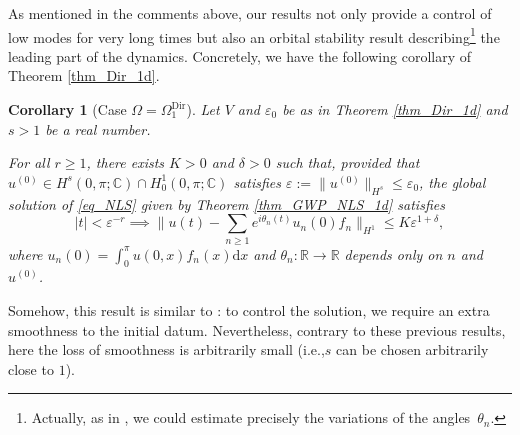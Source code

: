 \documentclass[11pt]{article}
\newcommand{\ie}{i.e.,\xspace}
\let\epsilon\varepsilon
\newtheorem{corollary}[theorem]{Corollary}
\theoremstyle{definition}
\begin{document}
As mentioned in the comments above, our results not only provide a control of low modes for very long times but also an orbital stability result describing\footnote{Actually, as in \cite[Th.\,1]{KtA}, we could estimate precisely the variations of the angles~$\theta_n$.} the leading part of the dynamics. Concretely, we have the following corollary of Theorem \ref{thm_Dir_1d}.
\begin{corollary}[Case $\Omega = \Omega^{\mathrm{Dir}}_1$] \label{cor_whaou}
Let $V$ and $\epsilon_0$ be as in Theorem \ref{thm_Dir_1d} and $s> 1$ be a real number.

For all $r\geq 1$, there exists $K>0$ and $\delta >0$ such that, provided that $u^{(0)}\in H^s(0,\pi;\mathbb{C}) \cap H^1_0(0,\pi;\mathbb{C})$ satisfies $\varepsilon:= \| u^{(0)} \|_{H^s} \leq \epsilon_0$, the global solution of \eqref{eq_NLS} given by Theorem \ref{thm_GWP_NLS_1d} satisfies
\[
|t|< \varepsilon^{-r} \implies \biggl\| u(t) - \sum_{n\geq 1} e^{i\theta_n(t)} u_n(0) f_n \biggr\|_{H^1} \leq K \varepsilon^{1+\delta},
\]
where $u_n(0) = \int_0^\pi u(0,x) f_n(x) \mathrm{d}x$ and $\theta_n: \mathbb{R} \to \mathbb{R}$ depends only on $n$ and $u^{(0)}$.
\end{corollary}
Somehow, this result is similar to \cite{Bou96,BFG20b}: to control the solution, we require an extra smoothness to the initial datum. Nevertheless, contrary to these previous results, here the loss of smoothness is arbitrarily small (\ie $s$ can be chosen arbitrarily close to $1$).
\end{document}
